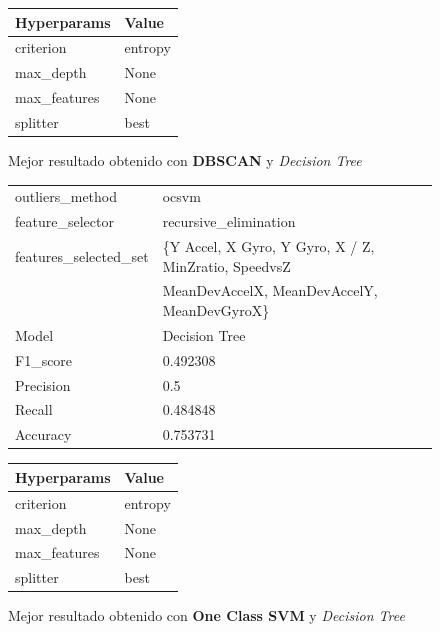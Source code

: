 \begin{appendices}
\begin{figure}[htb]
			\begin{tabular}{ll}
				\toprule
				 Hyperparams &   Value \\
				\midrule
				   criterion & entropy \\
				   max\_depth &    None \\
				max\_features &    None \\
					splitter &    best \\
				\bottomrule
			\end{tabular}
			\caption{Mejor resultado obtenido con \textbf{DBSCAN} y \emph{Decision Tree}}
			\label{table:20}
		\end{figure}

		\begin{figure}[htb]
			\centering
			\begin{tabular}{ll}
				\toprule
					  outliers\_method &                                              ocsvm \\
					 feature\_selector &                              recursive\_elimination \\
				features\_selected\_set & \{Y Accel, X Gyro, Y Gyro, X / Z, MinZratio, SpeedvsZ \\
									{} & MeanDevAccelX, MeanDevAccelY, MeanDevGyroX\} \\
								Model &                                      Decision Tree \\
						F1\_score &                                           0.492308 \\
					   Precision &                                                0.5 \\
						  Recall &                                           0.484848 \\
						Accuracy &                                           0.753731 \\
				\bottomrule
			\end{tabular}
			\newline
			\newline

			\begin{tabular}{ll}
				\toprule
				 Hyperparams &   Value \\
				\midrule
				   criterion & entropy \\
				   max\_depth &    None \\
				max\_features &    None \\
					splitter &    best \\
				\bottomrule
			\end{tabular}
			\caption{Mejor resultado obtenido con \textbf{One Class SVM} y \emph{Decision Tree}}
			\label{table:21}
		\end{figure}


\end{appendices}
